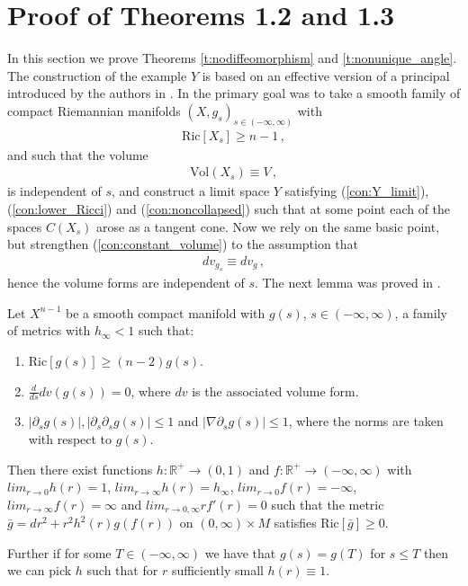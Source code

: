\documentclass[11pt]{article}
\newcommand{\Ric}{\text{Ric}}
\newcommand{\Vol}{\text{Vol}}
\newcommand{\RR}{\mathds{R}}
\begin{document}
\section{Proof of Theorems 1.2 and 1.3}

In this section we prove Theorems \ref{t:nodiffeomorphism} and \ref{t:nonunique_angle}.  The construction of the example $Y$ is based on an effective version of a principal introduced by the authors in \cite{CN2}.  In \cite{CN2} the primary goal was to take a smooth family of compact Riemannian manifolds $(X,g_s)_{s\in(-\infty,\infty)}$ with
\begin{align}
 \Ric[X_s]\geq n-1\, ,
\end{align}
and such that the volume
\begin{align}\label{con:constant_volume}
 \Vol(X_s)\equiv V\, ,
\end{align}
is independent of $s$, and construct a limit space $Y$ satisfying (\ref{con:Y_limit}),(\ref{con:lower_Ricci}) and (\ref{con:noncollapsed}) such that at some point each of the spaces $C(X_s)$ arose as a tangent cone.  Now we rely on the same basic point, but strengthen (\ref{con:constant_volume}) to the assumption that
\begin{align}\label{con:constant_volumeform}
dv_{g_s}\equiv dv_g\, ,
\end{align}
hence the volume forms are independent of $s$.  The next lemma was proved in \cite{CN2}.

\begin{lemma}\label{l:ExamTech}
Let $X^{n-1}$ be a smooth compact manifold with $g(s)$, $s\in (-\infty,\infty)$, a family of metrics with $h_\infty<1$ such that:
\begin{enumerate}
\item $\Ric[g(s)]\geq (n-2)g(s)$.
\item $\frac{d}{ds}dv(g(s))=0$, where $dv$ is the associated volume form.
\item $|\partial_{s}g(s)|,|\partial_{s}\partial_{s}g(s)|\leq 1$ and $|\nabla\partial_{s}g(s)|\leq 1$, where the norms are taken with respect to $g(s)$.
\end{enumerate}

Then there exist functions $h:\mathds{R}^{+}\rightarrow(0,1)$ and $f:\RR^{+}\rightarrow(-\infty,\infty)$ with $lim_{r\rightarrow 0}h(r)=1$, $lim_{r\rightarrow \infty}h(r)=h_\infty$, $lim_{r\rightarrow 0}f(r)=-\infty$, $lim_{r\rightarrow \infty}f(r)=\infty$ and $lim_{r\rightarrow 0,\infty}rf'(r)=0$ such that the metric $\bar{g}=dr^{2}+r^{2}h^{2}(r)g(f(r))$ on $(0,\infty)\times M$ satisfies $\Ric[\bar{g}]\geq 0$.

Further if for some $T\in (-\infty,\infty)$ we have that $g(s)=g(T)$ for $s\leq T$ then we can pick $h$ such that for $r$ sufficiently small $h(r)\equiv 1$.
\end{lemma}
\end{document}
